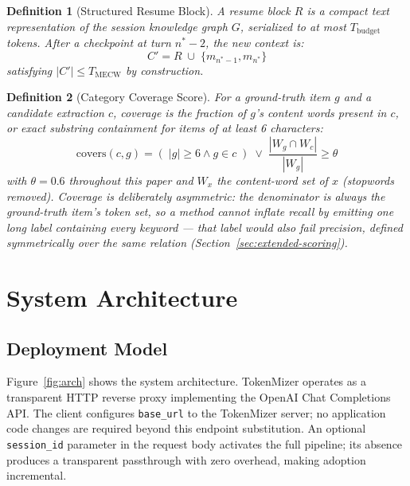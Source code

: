 \documentclass[journal]{IEEEtran}
\newtheorem{definition}{Definition}
\begin{document}
\begin{definition}[Structured Resume Block]
A resume block $R$ is a compact text representation of the
session knowledge graph $G$, serialized to at most
$T_{\mathrm{budget}}$ tokens.
After a checkpoint at turn $n^* - 2$, the new context is:
\begin{equation}
  C' = R \;\cup\; \{m_{n^*-1}, m_{n^*}\}
  \label{eq:resume}
\end{equation}
satisfying $|C'| \leq T_{\mathrm{MECW}}$ by construction.
\end{definition}

\begin{definition}[Category Coverage Score]
\label{def:coverage}
For a ground-truth item $g$ and a candidate extraction $c$,
coverage is the fraction of $g$'s content words present in
$c$, or exact substring containment for items of at least 6
characters:
\begin{equation}
  \mathrm{covers}(c, g) =
    \left(\;|g| \geq 6 \wedge g \in c\;\right) \;\vee\;
    \frac{|W_g \cap W_c|}{|W_g|} \geq \theta
  \label{eq:coverage}
\end{equation}
with $\theta = 0.6$ throughout this paper and $W_x$ the
content-word set of $x$ (stopwords removed).
Coverage is deliberately asymmetric: the denominator is always
the ground-truth item's token set, so a method cannot inflate
recall by emitting one long label containing every keyword ---
that label would also fail precision, defined symmetrically
over the same relation (Section~\ref{sec:extended-scoring}).
\end{definition}

\section{System Architecture}
\label{sec:system}

\subsection{Deployment Model}
\label{sec:deploy}

Figure~\ref{fig:arch} shows the system architecture.
TokenMizer operates as a transparent HTTP reverse proxy
implementing the OpenAI Chat Completions API.
The client configures \texttt{base\_url} to the TokenMizer
server; no application code changes are required beyond this
endpoint substitution.
An optional \texttt{session\_id} parameter in the request body
activates the full pipeline; its absence produces a transparent
passthrough with zero overhead, making adoption incremental.
\end{document}
